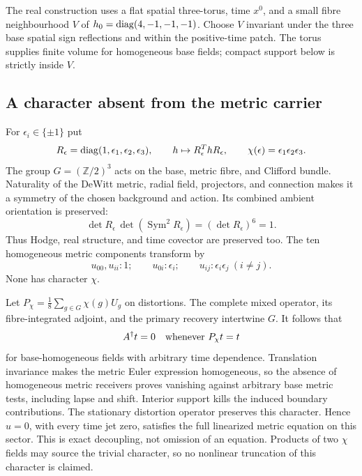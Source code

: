 The real construction \cite{RealEnergy} uses a flat spatial three-torus, time $x^0$, and a small fibre neighbourhood
$V$ of $h_0=\operatorname{diag}(4,-1,-1,-1)$. Choose $V$ invariant under the three base
spatial sign reflections and within the positive-time patch.
The torus supplies finite volume for homogeneous base fields; compact
support below is strictly inside $V$.

\subsection{A character absent from the metric carrier}
For $\epsilon_i\in\{\pm1\}$ put
\begin{equation}
 R_\epsilon=\operatorname{diag}(1,\epsilon_1,\epsilon_2,\epsilon_3),
 \qquad h\mapsto R_\epsilon^ThR_\epsilon,
 \qquad \chi(\epsilon)=\epsilon_1\epsilon_2\epsilon_3.
 \label{eq:reflection}
\end{equation}
The group $G=(\mathbb Z/2)^3$ acts on the base, metric fibre, and Clifford
bundle. Naturality of the DeWitt metric, radial field, projectors, and
connection makes it a symmetry of the chosen background and action.
Its combined ambient orientation is preserved:
\begin{equation}
 \det R_\epsilon\,\det(\operatorname{Sym}^2R_\epsilon)
          =(\det R_\epsilon)^6=1.\label{eq:orientation}
\end{equation}
Thus Hodge, real structure, and time covector are preserved too.
The ten homogeneous metric components transform by
\begin{equation}
 u_{00},u_{ii}:1;\qquad u_{0i}:\epsilon_i;\qquad
 u_{ij}:\epsilon_i\epsilon_j\ (i\ne j).\label{eq:characters}
\end{equation}
None has character $\chi$.

Let $P_\chi=\frac18\sum_{g\in G}\chi(g)U_g$ on distortions.
The complete mixed operator, its fibre-integrated adjoint, and the
primary recovery intertwine $G$. It follows that
\begin{equation}
 A^\dagger t=0\quad\hbox{whenever }P_\chi t=t
 \label{eq:metriczero}
\end{equation}
for base-homogeneous fields with arbitrary time dependence.
Translation invariance makes the metric Euler expression homogeneous,
so the absence of homogeneous metric receivers proves vanishing against
arbitrary base metric tests, including lapse and shift. Interior support
kills the induced boundary contributions.
The stationary distortion operator preserves this character. Hence
$u=0$, with every time jet zero, satisfies the full linearized metric
equation on this sector. This is exact decoupling, not omission of an
equation. Products of two $\chi$ fields may source the trivial character,
so no nonlinear truncation of this character is claimed.


